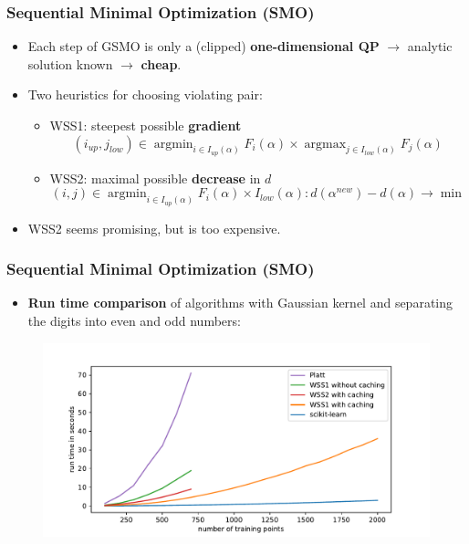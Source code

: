 \documentclass[12pt, compress]{beamer}
\newcommand{\titleC}{Sequential Minimal Optimization (SMO)}
\DeclareMathOperator{\argmax}{argmax}
\DeclareMathOperator{\argmin}{argmin}
\begin{document}
\begin{frame}
\frametitle{\titleC}
\begin{itemize}
	\item Each step of GSMO is only a (clipped) \textbf{\alert{one-dimensional QP}} $\rightarrow$ analytic solution known $\rightarrow$ \textbf{\alert{cheap}}.
	\item Two heuristics for choosing violating pair: \\
	\begin{itemize}
		\item WSS1: steepest possible \textbf{\alert{gradient}}
		\[
		(i_{up},j_{low}) \in \argmin_{i \in I_{up}(\alpha)}F_i(\alpha) \times \argmax_{j \in I_{low}(\alpha)}F_j(\alpha)
		\]
		\item WSS2: maximal possible \textbf{\alert{decrease}} in $d$
		\[
		(i,j) \in \argmin_{i \in I_{up}(\alpha)}F_i(\alpha) \times I_{low}(\alpha): d(\alpha^{new}) - d(\alpha) \rightarrow \min
		\]
		
	\end{itemize}
	\item WSS2 seems promising, but is too expensive.
\end{itemize}
\end{frame}

\begin{frame}
	\frametitle{\titleC}
	
		\begin{itemize}
		\item \textbf{\alert{Run time comparison}} of algorithms with Gaussian kernel and separating the digits into even and odd numbers:
		\end{itemize}

	\begin{figure}[h]
	\includegraphics[width=1\textwidth]{images_for_presentation/benchplot_gauss.pdf}
	\end{figure}

\end{frame}
\end{document}
